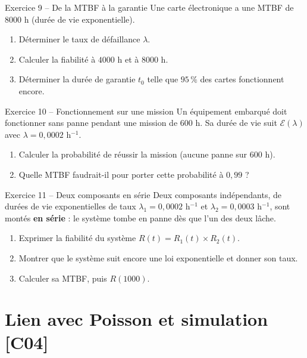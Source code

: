 \documentclass[a4paper,11pt]{article}
\begin{document}
\begin{exo}{Exercice 9 -- De la MTBF à la garantie}
Une carte électronique a une MTBF de $8000$ h (durée de vie exponentielle).
\begin{enumerate}[label=\alph*)]
  \item Déterminer le taux de défaillance $\lambda$.
  \item Calculer la fiabilité à $4000$ h et à $8000$ h.
  \item Déterminer la durée de garantie $t_0$ telle que $95\,\%$ des cartes fonctionnent encore.
\end{enumerate}
\end{exo}

\begin{exo}{Exercice 10 -- Fonctionnement sur une mission}
Un équipement embarqué doit fonctionner sans panne pendant une mission de $600$ h. Sa durée de vie suit $\mathcal{E}(\lambda)$ avec $\lambda = 0{,}0002$ h$^{-1}$.
\begin{enumerate}[label=\alph*)]
  \item Calculer la probabilité de réussir la mission (aucune panne sur $600$ h).
  \item Quelle MTBF faudrait-il pour porter cette probabilité à $0{,}99$ ?
\end{enumerate}
\end{exo}

\begin{exo}{Exercice 11 -- Deux composants en série}
Deux composants indépendants, de durées de vie exponentielles de taux $\lambda_1 = 0{,}0002$ h$^{-1}$ et $\lambda_2 = 0{,}0003$ h$^{-1}$, sont montés \textbf{en série} : le système tombe en panne dès que l'un des deux lâche.
\begin{enumerate}[label=\alph*)]
  \item Exprimer la fiabilité du système $R(t) = R_1(t) \times R_2(t)$.
  \item Montrer que le système suit encore une loi exponentielle et donner son taux.
  \item Calculer sa MTBF, puis $R(1000)$.
\end{enumerate}
\end{exo}

\section{Lien avec Poisson et simulation \hfill {\normalsize\color{uimmred}[C04]}}
\end{document}
